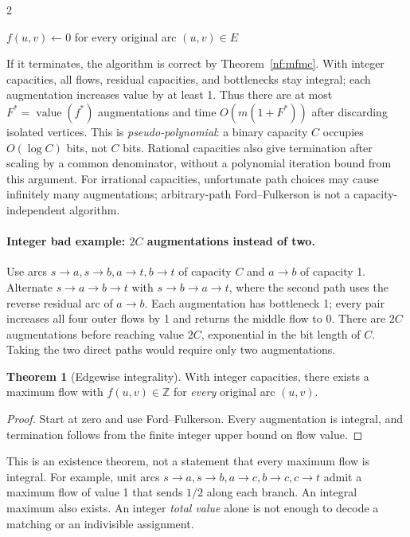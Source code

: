\documentclass[8pt]{extarticle}
\theoremstyle{definition}
\newtheorem{theorem}[definition]{Theorem}
\begin{document}
\begin{multicols*}{2}
\begin{algorithm}[H]
\caption{Ford--Fulkerson: arbitrary residual augmenting paths}
$f(u,v)\gets0$ for every original arc $(u,v)\in E$\;
\;
\end{algorithm}
If it terminates, the algorithm is correct by Theorem~\ref{nf:mfmc}.
With integer capacities, all flows, residual capacities, and bottlenecks stay
integral; each augmentation increases value by at least 1. Thus there are at
most $F^*=\operatorname{value}(f^*)$ augmentations and time
$O(m(1+F^*))$ after discarding isolated
vertices. This is \emph{pseudo-polynomial}: a binary capacity $C$ occupies
$O(\log C)$ bits, not $C$ bits. Rational capacities also give termination after
scaling by a common denominator, without a polynomial iteration bound from
this argument. For irrational capacities, unfortunate path choices may cause
infinitely many augmentations; arbitrary-path Ford--Fulkerson is not a
capacity-independent algorithm.

\paragraph{Integer bad example: $2C$ augmentations instead of two.}
Use arcs $s\to a,s\to b,a\to t,b\to t$ of capacity $C$ and
$a\to b$ of capacity 1. Alternate $s\to a\to b\to t$ with
$s\to b\to a\to t$, where the second path uses the reverse residual arc
of $a\to b$. Each augmentation has bottleneck 1; every pair increases all
four outer flows by 1 and returns the middle flow to 0. There are $2C$
augmentations before reaching value $2C$, exponential in the bit length of
$C$. Taking the two direct paths would require only two augmentations.

\begin{theorem}[Edgewise integrality]\label{nf:integrality}
With integer capacities, there exists a maximum flow with
$f(u,v)\in\mathbb Z$ for \emph{every} original arc $(u,v)$.
\end{theorem}
\begin{proof}
Start at zero and use Ford--Fulkerson. Every augmentation is integral, and
termination follows from the finite integer upper bound on flow value.
\end{proof}
This is an existence theorem, not a statement that every maximum flow is
integral. For example, unit arcs $s\to a,s\to b,a\to c,b\to c,c\to t$
admit a maximum flow of value 1 that sends $1/2$ along each branch.
An integral maximum also exists. An integer \emph{total value} alone is not
enough to decode a matching or an indivisible assignment.


\end{multicols*}
\end{document}
